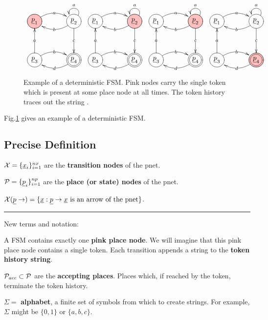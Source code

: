 \begin{figure}[h!]
$$
\begin{array}{cccc}
\xymatrix@C=3pc@R=3pc{
\PinkCircle{\rvp_1}\ar@/^1pc/[r]|a
&
\Circle{\rvp_2}\ar@/^1pc/[l]|b
\ar[d]|c \ar@(ru,lu)[]_a
\\
\Circle{\rvp_3}\ar@/^1pc/[r]|b
\ar[u]|a
&\DCircle{\rvp_4}\ar@/^1pc/[l]|d
}&
\xymatrix@C=3pc@R=3pc{
\Circle{\rvp_1}\ar@/^1pc/[r]|a
&
\PinkCircle{\rvp_2}\ar@/^1pc/[l]|b
\ar[d]|c \ar@(ru,lu)[]_a
\\
\Circle{\rvp_3}\ar@/^1pc/[r]|b
\ar[u]|a
&\DCircle{\rvp_4}\ar@/^1pc/[l]|d
}&
\xymatrix@C=3pc@R=3pc{
\Circle{\rvp_1}\ar@/^1pc/[r]|a
&
\PinkCircle{\rvp_2}\ar@/^1pc/[l]|b
\ar[d]|c \ar@(ru,lu)[]_a
\\
\Circle{\rvp_3}\ar@/^1pc/[r]|b
\ar[u]|a
&\DCircle{\rvp_4}\ar@/^1pc/[l]|d
}&
\xymatrix@C=3pc@R=3pc{
\Circle{\rvp_1}\ar@/^1pc/[r]|a
&
\Circle{\rvp_2}\ar@/^1pc/[l]|b
\ar[d]|c \ar@(ru,lu)[]_a
\\
\Circle{\rvp_3}\ar@/^1pc/[r]|b
\ar[u]|a
&\PinkDCircle{\rvp_4}\ar@/^1pc/[l]|d
}
\end{array}
$$
\caption{Example of a deterministic FSM. Pink nodes carry the single token which is present at 
some place node at all times.
The token history traces out the string .}
\label{fig-det-fsm}
\end{figure}
Fig.\ref{fig-det-fsm}
gives an example of a deterministic
FSM.

\subsection{Precise Definition}


$\calx =\{\rvx_i\}_{i=1}^{nx}$ are the {\bf transition nodes} of the pnet.

$\calp =\{\rvp_i\}_{i=1}^{np}$ are the {\bf place (or state) nodes} of the pnet.

$\calx(\rvp\rarrow)=\{\rvx: \rvp\rarrow\rvx \text{ is an arrow of the pnet}\}$.

\hrule
New terms and notation:

A FSM contains exactly one {\bf pink place node}. We will 
imagine that this pink place node contains a single token.
Each transition appends a string to the {\bf token history string}.

${\cal P}_{acc}\subset {\cal P}$ are the 
{\bf accepting places}. Places which, if reached by the token, terminate the token history.

$\Sigma=$ {\bf alphabet}, a finite set of symbols
from which to create strings. For example,
$\Sigma$ might be $\{0, 1\}$ or $\{a, b, c\}$.

